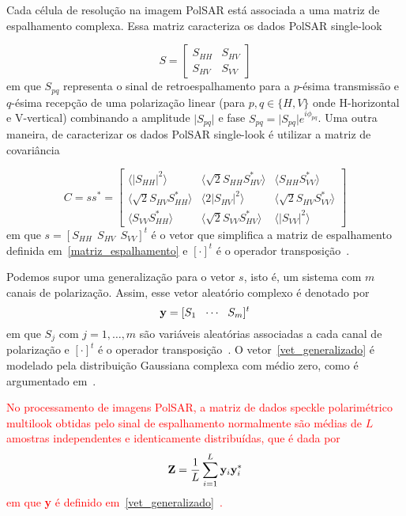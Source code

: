 \documentclass[a4paper,12pt]{article}
\begin{document}
Cada célula de resolução na imagem PolSAR está associada a uma matriz de espalhamento complexa. Essa matriz caracteriza os dados PolSAR single-look

\begin{equation}\label{matriz_espalhamento}
S =\begin{bmatrix}
S_{HH} & S_{HV}\\
S_{HV} & S_{VV}  
\end{bmatrix}
\end{equation}
em que $S_{pq}$ representa o sinal de retroespalhamento para a $p$-ésima transmissão e $q$-ésima recepção de uma polarização linear (para $p,q\in \{H,V\}$ onde H-horizontal e V-vertical) combinando a amplitude $\vert S_{pq}\vert$ e fase $S_{pq}=\vert S_{pq}\vert e^{i\phi_{pq}}$. Uma outra maneira, de caracterizar os dados PolSAR single-look é utilizar a matriz de covariância 

\begin{equation}\label{matriz_covariancia}
C = ss^{*}=\begin{bmatrix}
\langle \vert S_{HH}\vert^2\rangle & \langle \sqrt{2}S_{HH}S^{*}_{HV}\rangle & \langle S_{HH}S^{*}_{VV}\rangle\\
\langle \sqrt{2}S_{HV}S^{*}_{HH}\rangle & \langle 2\vert S_{HV}\vert^2\rangle & \langle \sqrt{2}S_{HV}S^{*}_{VV}\rangle\\
\langle S_{VV}S^{*}_{HH}\rangle & \langle \sqrt{2}S_{VV}S^{*}_{HV}\rangle & \langle \vert S_{VV}\vert^2\rangle  
\end{bmatrix}
\end{equation}
em que $s=[S_{HH}\ \ S_{HV}\ \ S_{VV}]^{t}$ é o vetor que simplifica a matriz de espalhamento definida em~\ref{matriz_espalhamento} e $[\cdot]^{t}$ é o operador transposição~\citep{Lee-2009,ma-2015}. 

Podemos supor uma generalização para o vetor $s$, isto é, um sistema com $m$ canais de polarização. Assim, esse vetor aleatório complexo é denotado por
\begin{equation}
{\bf y}=[S_{1}\ \ \cdots \ \ S_{m}]^{t}\label{vet_generalizado}
\end{equation}
em que $S_{j}$ com $j=1,\dots,m$ são variáveis aleatórias associadas a cada canal de polarização e $[\cdot]^{t}$ é o operador transposição~\citep{Frery-2014}. O vetor~\ref{vet_generalizado} é modelado pela distribuição Gaussiana complexa com médio zero, como é argumentado em~\citep{Goodman-1963}. 

\textcolor{red}{No processamento de imagens PolSAR, a matriz de dados speckle polarimétrico multilook obtidas pelo sinal de espalhamento normalmente são médias de $L$ amostras independentes e identicamente distribuídas, que é dada por
\begin{equation}
{\bf Z}=\frac{1}{L}\sum_{i=1}^{L}{\bf y}_{i}{\bf y}_{i}^{*}
\end{equation}
em que {\bf y} é definido em~\ref{vet_generalizado}~\citep{Frery-2014}. }
\end{document}

